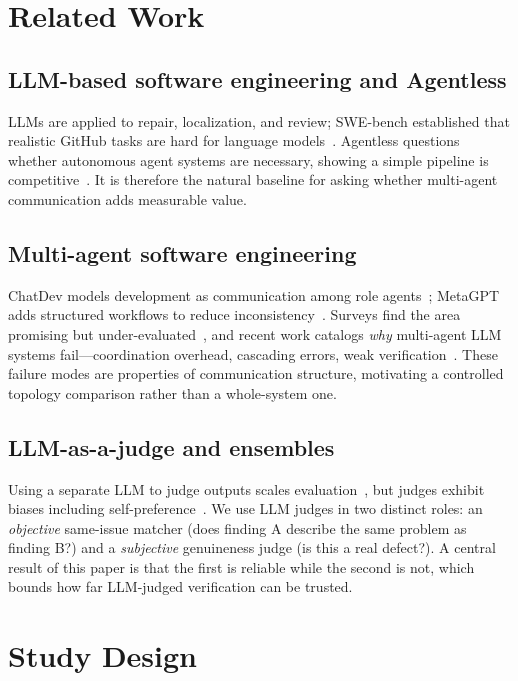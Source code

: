 \documentclass[conference]{IEEEtran}
\begin{document}
\section{Related Work}
\subsection{LLM-based software engineering and Agentless}
LLMs are applied to repair, localization, and review; SWE-bench established that
realistic GitHub tasks are hard for language models~\cite{swebench}. Agentless
questions whether autonomous agent systems are necessary, showing a simple
pipeline is competitive~\cite{agentless}. It is therefore the natural baseline
for asking whether multi-agent communication adds measurable value.

\subsection{Multi-agent software engineering}
ChatDev models development as communication among role agents~\cite{chatdev};
MetaGPT adds structured workflows to reduce inconsistency~\cite{metagpt}. Surveys
find the area promising but under-evaluated~\cite{survey}, and recent work
catalogs \emph{why} multi-agent LLM systems fail---coordination overhead,
cascading errors, weak verification~\cite{failures}. These failure modes are
properties of communication structure, motivating a controlled topology
comparison rather than a whole-system one.

\subsection{LLM-as-a-judge and ensembles}
Using a separate LLM to judge outputs scales evaluation~\cite{llmjudge}, but
judges exhibit biases including self-preference~\cite{selfpref}. We use LLM judges
in two distinct roles: an \emph{objective} same-issue matcher (does finding A
describe the same problem as finding B?) and a \emph{subjective} genuineness
judge (is this a real defect?). A central result of this paper is that the first
is reliable while the second is not, which bounds how far LLM-judged verification
can be trusted.

\section{Study Design}
\end{document}
